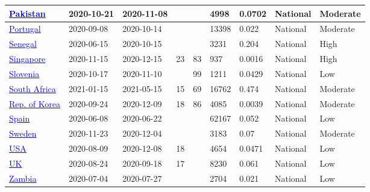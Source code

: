 \begin{table}[!ht]
\begin{center}
\begin{tabular}{p{2cm} | p{1.6cm} | p{1.6cm} | p{0.8cm} | p{0.8cm} | p{1cm} | p{1.3cm} | p{1.2cm} | p{1.2cm}}
           \hline 
           \href{https://bmjopen.bmj.com/content/12/4/e055381.abstract}{\textcolor{blue}{Pakistan}} & 2020-10-21 & 2020-11-08 &  &  & 4998 & 0.0702 & National & Moderate \\ 
           \hline 
           \href{https://wwwnc.cdc.gov/eid/article/27/11/21-0636\_article}{\textcolor{blue}{Portugal}} & 2020-09-08 & 2020-10-14 &  &  & 13398 & 0.022 & National & Moderate \\ 
           \hline 
           \href{https://www.ncbi.nlm.nih.gov/pmc/articles/PMC8702669/}{\textcolor{blue}{Senegal}} & 2020-06-15 & 2020-10-15 &  &  & 3231 & 0.204 & National & High \\ 
           \hline 
           \href{https://papers.ssrn.com/sol3/papers.cfm?abstract\_id=3826194}{\textcolor{blue}{Singapore}} & 2020-11-15 & 2020-12-15 & 23 & 83 & 937 & 0.0016 & National & High \\ 
           \hline 
           \href{https://dx.doi.org/10.1016/j.cmi.2021.03.009}{\textcolor{blue}{Slovenia}} & 2020-10-17 & 2020-11-10 &  & 99 & 1211 & 0.0429 & National & Low \\ 
           \hline 
           \href{https://assets.researchsquare.com/files/rs-690372/v2\_covered.pdf?c=1627923426}{\textcolor{blue}{South Africa}} & 2021-01-15 & 2021-05-15 & 15 & 69 & 16762 & 0.474 & National & Moderate \\ 
           \hline 
           \href{https://bmjopen.bmj.com/content/11/4/e049837.abstract}{\textcolor{blue}{Rep. of Korea}} & 2020-09-24 & 2020-12-09 & 18 & 86 & 4085 & 0.0039 & National & Moderate \\ 
           \hline 
           \href{https://www.mscbs.gob.es/ciudadanos/ene-covid/docs/ESTUDIO\_ENE-COVID19\_INFORME\_FINAL.pdf}{\textcolor{blue}{Spain}} & 2020-06-08 & 2020-06-22 &  &  & 62167 & 0.052 & National & Low \\ 
           \hline 
           \href{https://www.folkhalsomyndigheten.se/contentassets/376f9021a4c84da08de18ac597284f0c/pavisning-antikroppar-genomgangen-covid-19-blodgivare-delrapport-2.pdf}{\textcolor{blue}{Sweden}} & 2020-11-23 & 2020-12-04 &  &  & 3183 & 0.07 & National & Moderate \\ 
           \hline 
           \href{https://dx.doi.org/10.1093/cid/ciab626}{\textcolor{blue}{USA}} & 2020-08-09 & 2020-12-08 & 18 &  & 4654 & 0.0471 & National & Low \\ 
           \hline 
           \href{https://www.gov.uk/government/publications/national-covid-19-surveillance-reports}{\textcolor{blue}{UK}} & 2020-08-24 & 2020-09-18 & 17 &  & 8230 & 0.061 & National & Low \\ 
           \hline 
           \href{https://www.thelancet.com/journals/langlo/article/PIIS2214-109X(21)00053-X/fulltext}{\textcolor{blue}{Zambia}} & 2020-07-04 & 2020-07-27 &  &  & 2704 & 0.021 & National & Low \\ 
           \hline 

    \end{tabular}
    \end{center}
\end{table}